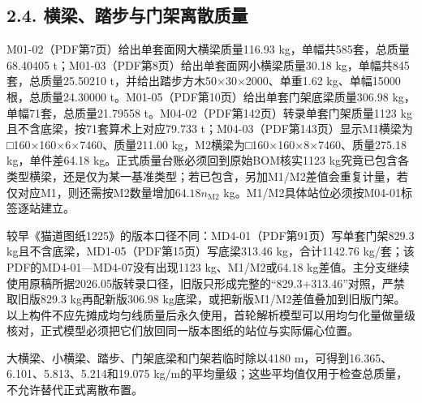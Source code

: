\documentclass[UTF8,a4paper,11pt,fontset=none]{ctexart}
\begin{document}
\subsection*{2.4. 横梁、踏步与门架离散质量}
M01-02（PDF第7页）给出单套面网大横梁质量116.93 kg，单幅共585套，总质量68.40405 t；M01-03（PDF第8页）给出单套面网小横梁质量30.18 kg，单幅共845套，总质量25.50210 t，并给出踏步方木50×30×2000、单重1.62 kg、单幅15000根，总质量24.30000 t。M01-05（PDF第10页）给出单套门架底梁质量306.98 kg，单幅71套，总质量21.79558 t。M04-02（PDF第142页）转录单套门架质量1123 kg且不含底梁，按71套算术上对应79.733 t；M04-03（PDF第143页）显示M1横梁为□160×160×6×7460、质量211.00 kg，M2横梁为□160×160×8×7460、质量275.18 kg，单件差64.18 kg。正式质量台账必须回到原始BOM核实1123 kg究竟已包含各类型横梁，还是仅为某一基准类型；若已包含，另加M1/M2差值会重复计量，若仅对应M1，则还需按M2数量增加\(64.18n_{\mathrm{M2}}\)\allowbreak{} kg。M1/M2具体站位必须按M04-01标签逐站建立。\par
较早《猫道图纸1225》的版本口径不同：MD4-01（PDF第91页）写单套门架829.3 kg且不含底梁，MD1-05（PDF第15页）写底梁313.46 kg，合计1142.76 kg/套；该PDF的MD4-01—MD4-07没有出现1123 kg、M1/M2或64.18 kg差值。主分支继续使用原稿所据2026.05版转录口径，旧版只形成完整的“829.3+313.46”对照，严禁取旧版829.3 kg再配新版306.98 kg底梁，或把新版M1/M2差值叠加到旧版门架。以上构件不应先摊成均匀线质量后永久使用，首轮解析模型可以用均匀化量做量级核对，正式模型必须把它们放回同一版本图纸的站位与实际偏心位置。\par
大横梁、小横梁、踏步、门架底梁和门架若临时除以4180 m，可得到16.365、6.101、5.813、5.214和19.075 kg/m的平均量级；这些平均值仅用于检查总质量，不允许替代正式离散布置。\par
{}
\end{document}
